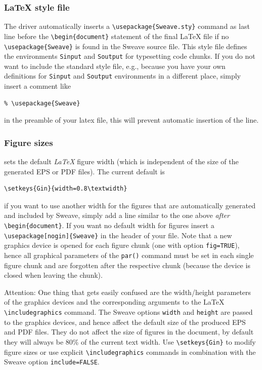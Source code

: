 \documentclass[a4paper]{article}
\begin{document}
\subsubsection{\LaTeX{} style file}

The driver automatically inserts a \verb|\usepackage{Sweave.sty}|
command as last line before the \verb|\begin{document}| statement of
  the final \LaTeX{} file if no \verb|\usepackage{Sweave}| is found in
  the Sweave source file. This style file defines the environments
  \texttt{Sinput} and \texttt{Soutput} for typesetting code chunks. If
  you do not want to include the standard style file, e.g., because
  you have your own definitions for \texttt{Sinput} and
  \texttt{Soutput} environments in a different place, simply insert a
  comment like
\begin{verbatim}
% \usepackage{Sweave}
\end{verbatim}
in the preamble of your latex file, this will prevent automatic
insertion of the line.


\subsubsection{Figure sizes}

 sets the default \emph{\LaTeX{}} figure width (which
is independent of the size of the generated EPS or PDF files).  The
current default is
\begin{verbatim}
\setkeys{Gin}{width=0.8\textwidth}
\end{verbatim}
if you want to use another width for the figures that are
automatically generated and included by Sweave, simply add a line
similar to the one above \emph{after} \verb|\begin{document}|. If you
want no default width for figures insert a
\verb|\usepackage[nogin]{Sweave}| in the header of your file.  Note
that a new graphics device is opened for each figure chunk (one with
option \texttt{fig=TRUE}), hence all graphical parameters of the
\texttt{par()} command must be set in each single figure chunk and
are forgotten after the respective chunk (because the device is
closed when leaving the chunk).

Attention: One thing that gets easily confused are the width/height
parameters of the \R{} graphics devices and the corresponding arguments
to the \LaTeX{} \verb|\includegraphics| command. The Sweave options
\texttt{width} and \texttt{height} are passed to the \R{} graphics
devices, and hence affect the default size of the produced EPS and PDF
files. They do not affect the size of figures in the document, by
default they will always be 80\% of the current text width. Use
\verb|\setkeys{Gin}| to modify figure sizes or use explicit
\verb|\includegraphics| commands in combination with the Sweave option
\texttt{include=FALSE}.
\end{document}
